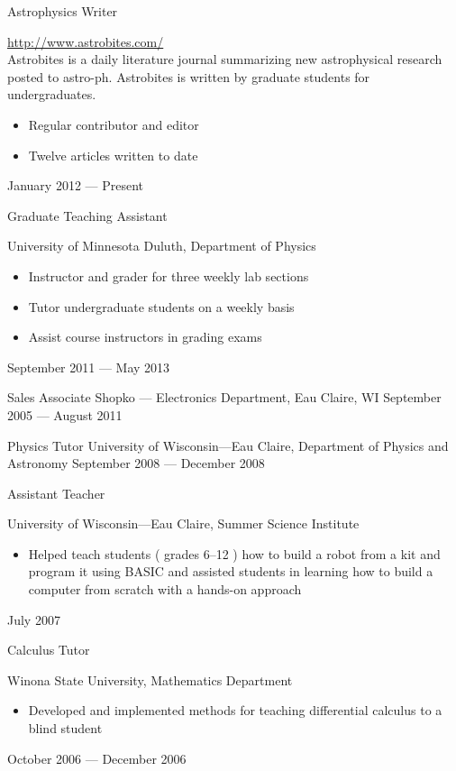 \documentclass{cv}
\begin{document}
\begin{resume}
\object
{Astrophysics Writer}
{\rm \href{http://astrobites.com/}{http://www.astrobites.com/} \noemph \\
Astrobites is a daily literature journal summarizing new astrophysical research posted to astro-ph. Astrobites is written by graduate students for 	undergraduates.
	\begin{itemize}
		\item Regular contributor and editor
		\item Twelve articles written to date 
	\end{itemize}
 }
{January 2012 --- Present}


\object
{Graduate Teaching Assistant}
{University of Minnesota Duluth, Department of Physics \noemph
\begin{itemize}
		\item Instructor and grader for three weekly lab sections
		\item Tutor undergraduate students on a weekly basis
		\item Assist course instructors in grading exams
	\end{itemize}
 }
{September 2011 --- May 2013}


\object
{Sales Associate}
{Shopko --- Electronics Department, Eau Claire, WI}
{September 2005 --- August 2011}


\object
{Physics Tutor}
{University of Wisconsin---Eau Claire, Department of Physics and Astronomy}
{September 2008 --- December 2008}


\object
{Assistant Teacher}
{University of Wisconsin---Eau Claire, Summer Science Institute \noemph
\begin{itemize}
		\item Helped teach students ( grades 6--12 ) how to build a robot from a kit and program it using BASIC and assisted students in learning how to build a computer from scratch with a hands-on approach
	\end{itemize}
 }
{July 2007}


\object
{Calculus Tutor}
{Winona State University, Mathematics Department \noemph
\begin{itemize}
		\item Developed and implemented methods for teaching differential calculus to a blind student
	\end{itemize}
 }
{October 2006 --- December 2006}


\newpage



\end{resume}
\end{document}
